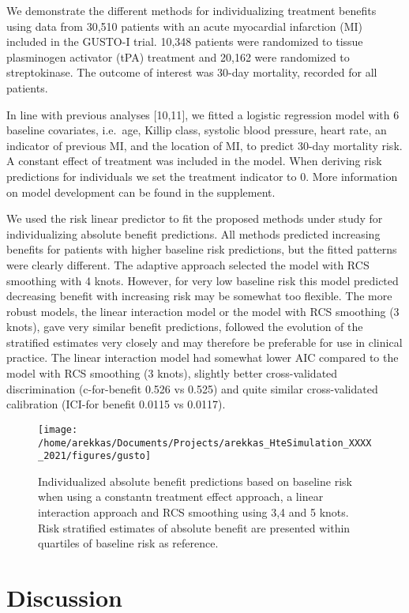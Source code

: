 \documentclass{article}
\begin{document}
We demonstrate the different methods for individualizing treatment
benefits using data from 30,510 patients with an acute myocardial
infarction (MI) included in the GUSTO-I trial. 10,348 patients were
randomized to tissue plasminogen activator (tPA) treatment and 20,162
were randomized to streptokinase. The outcome of interest was 30-day
mortality, recorded for all patients.

In line with previous analyses {[}10,11{]}, we fitted a logistic
regression model with 6 baseline covariates, i.e.~age, Killip class,
systolic blood pressure, heart rate, an indicator of previous MI, and
the location of MI, to predict 30-day mortality risk. A constant effect
of treatment was included in the model. When deriving risk predictions
for individuals we set the treatment indicator to 0. More information on
model development can be found in the supplement.

We used the risk linear predictor to fit the proposed methods under
study for individualizing absolute benefit predictions. All methods
predicted increasing benefits for patients with higher baseline risk
predictions, but the fitted patterns were clearly different. The
adaptive approach selected the model with RCS smoothing with 4 knots.
However, for very low baseline risk this model predicted decreasing
benefit with increasing risk may be somewhat too flexible. The more
robust models, the linear interaction model or the model with RCS
smoothing (3 knots), gave very similar benefit predictions, followed the
evolution of the stratified estimates very closely and may therefore be
preferable for use in clinical practice. The linear interaction model
had somewhat lower AIC compared to the model with RCS smoothing (3
knots), slightly better cross-validated discrimination (c-for-benefit
0.526 vs 0.525) and quite similar cross-validated calibration (ICI-for
benefit 0.0115 vs 0.0117).

\begin{figure}
\texttt{[image: /home/arekkas/Documents/Projects/arekkas\_HteSimulation\_XXXX\_2021/figures/gusto]} \caption{Individualized absolute benefit predictions based on baseline risk when using a constantn treatment effect approach, a linear interaction approach and RCS smoothing using 3,4 and 5 knots. Risk stratified estimates of absolute benefit are presented within quartiles of baseline risk as reference.}\label{fig:gusto}
\end{figure}

\hypertarget{discussion}{%
\section{Discussion}\label{discussion}}
\end{document}
